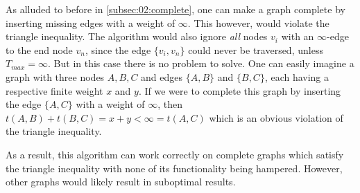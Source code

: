 As alluded to before in \cref{subsec:02:complete}, one can make a graph complete by inserting missing edges with a weight of $\infty$.
This however, would violate the triangle inequality.
The algorithm would also ignore \emph{all} nodes $v_i$ with an $\infty$-edge to the end node $v_n$, since the edge $\{v_i, v_n\}$ could never be traversed, unless $T_{max} = \infty$.
But in this case there is no problem to solve.
One can easily imagine a graph with three nodes $A, B, C$ and edges $\{A, B\}$ and $\{B, C\}$, each having a respective finite weight $x$ and $y$.
If we were to complete this graph by inserting the edge $\{A, C\}$ with a weight of $\infty$, then $t(A, B) + t(B,C) = x + y < \infty = t(A, C)$
which is an obvious violation of the triangle inequality.

As a result, this algorithm can work correctly on complete graphs which satisfy the triangle inequality with none of its functionality being hampered.
However, other graphs would likely result in suboptimal results. 
